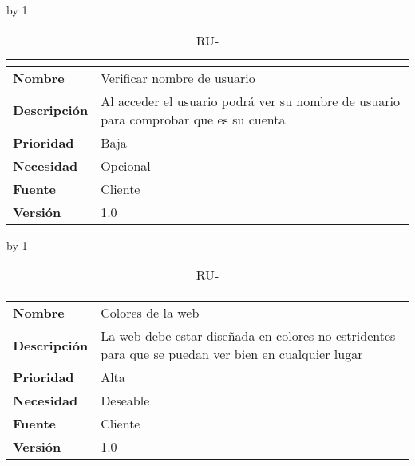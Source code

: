 \advance\ru by 1
\begin{table}[H]
	\caption{RU-\number\ru}
	\begin{tabular}{|l|p{}|}
		\hline
		\multicolumn{2}{|c|}{\cellcolor[HTML]{BFBFBF}{\color[HTML]{000000} \textbf{RU-\number\ru}}} \\ \hline
		\textbf{Nombre}      & Verificar nombre de usuario                                                          \\ \hline
		\textbf{Descripción} & Al acceder el usuario podrá ver su nombre de usuario para comprobar que es su cuenta \\ \hline
		\textbf{Prioridad}   & Baja                                                                                 \\ \hline
		\textbf{Necesidad}   & Opcional                                                                             \\ \hline
		\textbf{Fuente}      & Cliente                                                                              \\ \hline
		\textbf{Versión}     & 1.0                                                                                  \\ \hline
	\end{tabular}
\end{table}
\advance\ru by 1
\begin{table}[H]
	\caption{RU-\number\ru}
	\begin{tabular}{|l|p{}|}
		\hline
		\multicolumn{2}{|c|}{\cellcolor[HTML]{BFBFBF}{\color[HTML]{000000} \textbf{RU-\number\ru}}} \\ \hline
		\textbf{Nombre}      & Colores de la web                                                                                   \\ \hline
		\textbf{Descripción} & La web debe estar diseñada en colores no estridentes para que se puedan ver bien en cualquier lugar \\ \hline
		\textbf{Prioridad}   & Alta                                                                                                \\ \hline
		\textbf{Necesidad}   & Deseable                                                                                            \\ \hline
		\textbf{Fuente}      & Cliente                                                                                             \\ \hline
		\textbf{Versión}     & 1.0                                                                                                 \\ \hline
	\end{tabular}
\end{table}
